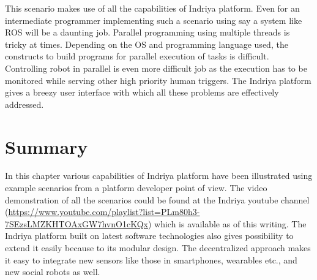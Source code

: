 This scenario makes use of all the capabilities of Indriya platform. Even for an intermediate programmer implementing such a scenario using say a system like ROS \cite{quigley2009ros} will be a daunting job. Parallel programming using multiple threads is tricky at times. Depending on the OS and programming language used, the constructs to build programs for parallel execution of tasks is difficult. Controlling robot in parallel is even more difficult job as the execution has to be monitored while serving other high priority human triggers. The Indriya platform gives a breezy user interface with which all these problems are effectively addressed.
\section{Summary}
In this chapter various capabilities of Indriya platform have been illustrated using example scenarios from a platform developer point of view. The video demonstration of all the scenarios could be found at the Indriya youtube channel (\url{https://www.youtube.com/playlist?list=PLm80h3-7SEzsLMZKHTOAxGW7hvnO1cKQx}) which is available as of this writing.
The Indriya platform built on latest software technologies also gives possibility to extend it easily because to its modular design. The decentralized approach makes it easy to integrate new sensors like those in smartphones, wearables etc., and new social robots as well. 